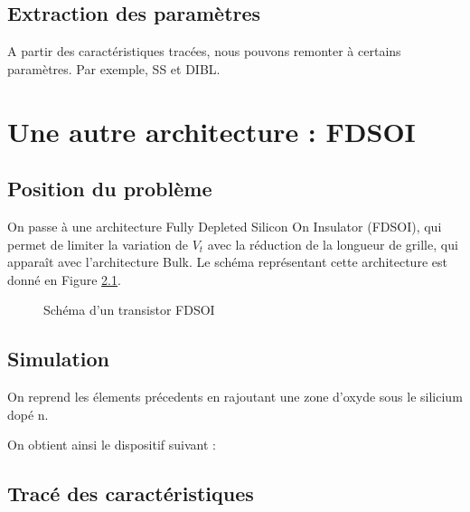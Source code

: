 \documentclass[a4paper,11pt]{report}
\begin{document}
\section{Extraction des paramètres}
A partir des caractéristiques tracées, nous pouvons remonter à certains paramètres. Par exemple, SS et DIBL.




\chapter{Une autre architecture : FDSOI}

\section{Position du problème}

On passe à une architecture Fully Depleted Silicon On Insulator (FDSOI), qui permet de limiter la variation de $V_t$ avec la réduction de la longueur de grille, qui apparaît avec l'architecture Bulk.  Le schéma représentant cette architecture est donné en Figure \ref{SchemaFDSOI}.

\begin{figure}[H]
    \centering
    \caption{Schéma d'un transistor FDSOI}
    \label{SchemaFDSOI}
\end{figure}

\section{Simulation}
On reprend les élements précedents en rajoutant une zone d'oxyde sous le silicium dopé n.

On obtient ainsi le dispositif suivant :



\section{Tracé des caractéristiques}
\end{document}
